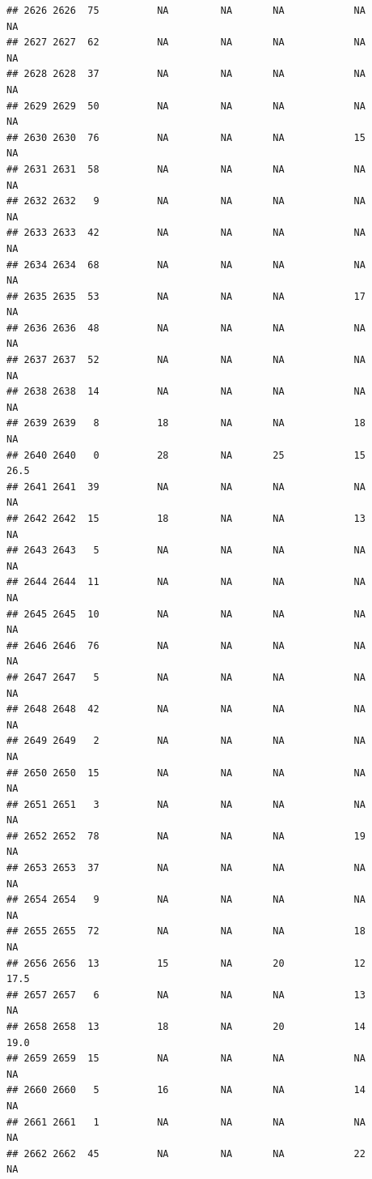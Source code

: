 \documentclass[man]{apa6}
\begin{document}
\begin{verbatim}
## 2626 2626  75          NA         NA       NA            NA       NA
## 2627 2627  62          NA         NA       NA            NA       NA
## 2628 2628  37          NA         NA       NA            NA       NA
## 2629 2629  50          NA         NA       NA            NA       NA
## 2630 2630  76          NA         NA       NA            15       NA
## 2631 2631  58          NA         NA       NA            NA       NA
## 2632 2632   9          NA         NA       NA            NA       NA
## 2633 2633  42          NA         NA       NA            NA       NA
## 2634 2634  68          NA         NA       NA            NA       NA
## 2635 2635  53          NA         NA       NA            17       NA
## 2636 2636  48          NA         NA       NA            NA       NA
## 2637 2637  52          NA         NA       NA            NA       NA
## 2638 2638  14          NA         NA       NA            NA       NA
## 2639 2639   8          18         NA       NA            18       NA
## 2640 2640   0          28         NA       25            15     26.5
## 2641 2641  39          NA         NA       NA            NA       NA
## 2642 2642  15          18         NA       NA            13       NA
## 2643 2643   5          NA         NA       NA            NA       NA
## 2644 2644  11          NA         NA       NA            NA       NA
## 2645 2645  10          NA         NA       NA            NA       NA
## 2646 2646  76          NA         NA       NA            NA       NA
## 2647 2647   5          NA         NA       NA            NA       NA
## 2648 2648  42          NA         NA       NA            NA       NA
## 2649 2649   2          NA         NA       NA            NA       NA
## 2650 2650  15          NA         NA       NA            NA       NA
## 2651 2651   3          NA         NA       NA            NA       NA
## 2652 2652  78          NA         NA       NA            19       NA
## 2653 2653  37          NA         NA       NA            NA       NA
## 2654 2654   9          NA         NA       NA            NA       NA
## 2655 2655  72          NA         NA       NA            18       NA
## 2656 2656  13          15         NA       20            12     17.5
## 2657 2657   6          NA         NA       NA            13       NA
## 2658 2658  13          18         NA       20            14     19.0
## 2659 2659  15          NA         NA       NA            NA       NA
## 2660 2660   5          16         NA       NA            14       NA
## 2661 2661   1          NA         NA       NA            NA       NA
## 2662 2662  45          NA         NA       NA            22       NA

\end{verbatim}
\end{document}
